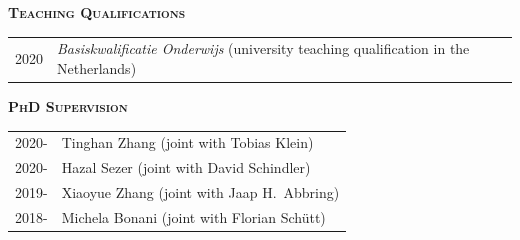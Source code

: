 \documentclass[11pt,overlapped,line,letterpaper]{article}
\newcommand{\cvsec}[1]{\vspace{\baselineskip}\textbf{\textsc{#1}}}
\begin{document}
\cvsec{Teaching Qualifications}\smallskip \\
\begin{tabularx}{\textwidth}{lX}
  2020 & \emph{Basiskwalificatie Onderwijs} (university teaching qualification  in the Netherlands)
\end{tabularx}


\cvsec{PhD Supervision}\smallskip \\
\begin{tabularx}{\textwidth}{lX}
  2020- & Tinghan Zhang (joint with Tobias Klein) \\
  2020- & Hazal Sezer (joint with David Schindler) \\
  2019- & Xiaoyue Zhang (joint with Jaap H.~Abbring) \\
  2018- & Michela Bonani (joint with Florian Schütt) \\
\end{tabularx}
\end{document}

